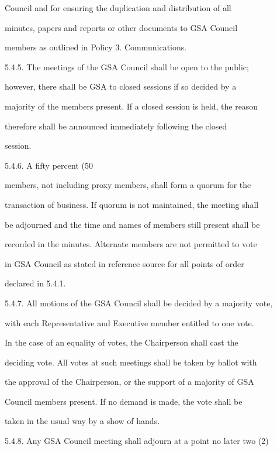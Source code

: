 \documentclass{article}
\begin{document}
Council   and   for   ensuring  the   duplication  and   distribution   of   all  

minutes,  papers  and  reports  or  other  documents  to  GSA  Council  

members as outlined in Policy 3. Communications.  



5.4.5. The  meetings  of  the  GSA   Council  shall  be  open  to  the  public;  

however,  there  shall  be  GSA  to  closed  sessions  if  so  decided  by  a  

majority of the members present. If a closed session is held, the reason  

therefore   shall   be   announced   immediately   following   the   closed  

session.  



5.4.6. A  fifty  percent  (50%

members, not including proxy members, shall form a quorum for the  

transaction of business. If quorum is not maintained, the meeting shall  

be adjourned and the time and names of members still present shall be  

recorded in the minutes.  Alternate members are not permitted to vote  

in  GSA  Council  as  stated  in  reference  source  for  all  points  of  order  

declared in 5.4.1.  



5.4.7. All motions of the  GSA  Council shall be decided by a majority vote,  

with each Representative and Executive  member entitled to one vote.  

In  the  case  of  an  equality  of  votes,  the  Chairperson  shall  cast  the  

deciding vote. All votes at such meetings shall be taken by ballot with  

the approval of the Chairperson, or the support of a majority of  GSA  

Council  members  present.  If  no  demand  is  made,  the  vote  shall  be  

taken in the usual way by a show of hands.  



5.4.8. Any  GSA  Council  meeting  shall  adjourn  at  a  point  no  later  two  (2)  
\end{document}
